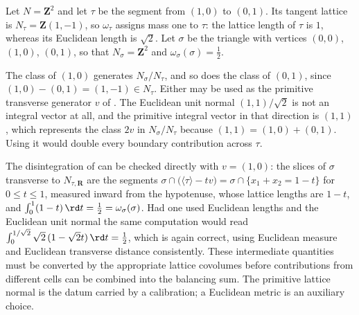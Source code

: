 \begin{example}
\label{ex:ch11-euclidean-normal-trap}
Let $N=\mathbf Z^2$ and let $\tau$ be the segment from $(1,0)$ to $(0,1)$.
Its tangent lattice is $N_\tau=\mathbf Z(1,-1)$, so $\omega_\tau$ assigns
mass one to $\tau$: the lattice length of $\tau$ is $1$, whereas its
Euclidean length is $\sqrt2$.  Let $\sigma$ be the triangle with vertices
$(0,0)$, $(1,0)$, $(0,1)$, so that $N_\sigma=\mathbf Z^2$ and
$\omega_\sigma(\sigma)=\tfrac12$.

The class of $(1,0)$ generates $N_\sigma/N_\tau$, and so does the class of
$(0,1)$, since $(1,0)-(0,1)=(1,-1)\in N_\tau$.  Either may be used as the
primitive transverse generator $v$ of
.  The Euclidean unit normal
$(1,1)/\sqrt2$ is not an integral vector at all, and the primitive integral
vector in that direction is $(1,1)$, which represents the class $2v$ in
$N_\sigma/N_\tau$ because $(1,1)=(1,0)+(0,1)$.  Using it would double every
boundary contribution across $\tau$.

The disintegration of  can be
checked directly with $v=(1,0)$: the slices of $\sigma$ transverse to
$N_{\tau,\mathbf R}$ are the segments
$\sigma\cap\bigl(\langle\tau\rangle-tv\bigr)
 =\sigma\cap\{x_1+x_2=1-t\}$ for
$0\le t\le1$, measured inward from the hypotenuse, whose lattice lengths are
$1-t$, and
$\int_0^1(1-t)\,\rd t=\tfrac12=\omega_\sigma(\sigma)$.  Had one used
Euclidean lengths and the Euclidean unit normal the same computation would
read $\int_0^{1/\sqrt2}\sqrt2\,(1-\sqrt2 t)\,\rd t=\tfrac12$, which is again
correct, using Euclidean measure and Euclidean transverse distance
consistently.  These intermediate quantities must be converted by the
appropriate lattice covolumes before contributions from different cells
can be combined into the balancing sum.  The primitive lattice normal is
the datum carried by a calibration; a Euclidean metric is an auxiliary
choice.
\end{example}

